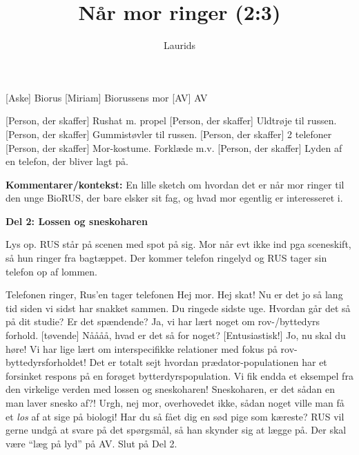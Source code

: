 \documentclass[a4paper,11pt]{article}
\title{Når mor ringer (2:3)}
\author{Laurids}
\begin{document}
\maketitle

\begin{roles}
    [Aske] Biorus
    [Miriam] Biorussens mor
    [AV] AV
\end{roles}

\begin{props}
    [Person, der skaffer] Rushat m. propel
    [Person, der skaffer] Uldtrøje til russen.
    [Person, der skaffer] Gummistøvler til russen.
    [Person, der skaffer] 2 telefoner
    [Person, der skaffer] Mor-kostume. Forklæde m.v.
    [Person, der skaffer] Lyden af en telefon, der bliver lagt på.
\end{props}

\begin{sketch}

\textbf{Kommentarer/kontekst:}
En lille sketch om hvordan det er når mor ringer til den unge BioRUS, der bare elsker sit fag, og hvad mor egentlig er interesseret i.


\begin{center}
\textbf{Del 2: Lossen og sneskoharen}
\end{center}

Lys op.
\scene RUS står på scenen med spot på sig. Mor når evt ikke ind pga sceneskift, så hun ringer fra bagtæppet. Der kommer telefon ringelyd og RUS tager sin telefon op af lommen.

\scene Telefonen ringer, Rus'en tager telefonen
 Hej mor.
 Hej skat! Nu er det jo så lang tid siden vi sidst har snakket sammen.
 Du ringede sidste uge.
 Hvordan går det så på dit studie? Er det spændende?
 Ja, vi har lært noget om rov-/byttedyrs forhold.
[tøvende] Nåååå, hvad er det så for noget?
[Entusiastisk!] Jo, nu skal du høre! Vi har lige lært om interspecifikke relationer med fokus på rov-byttedyrsforholdet! Det er totalt sejt hvordan prædator-populationen har et forsinket respons på en forøget bytterdyrspopulation. Vi fik endda et eksempel fra den virkelige verden med lossen og sneskoharen!
 Sneskoharen, er det sådan en man laver snesko af?!
 Urgh, nej mor, overhovedet ikke, sådan noget ville man få et \emph{los} af at sige på biologi!
 Har du så fået dig en sød pige som kæreste?
\scene RUS vil gerne undgå at svare på det spørgsmål, så han skynder sig at lægge på. Der skal være ``læg på lyd'' på AV.
\scene Slut på Del 2.

\end{sketch}
\end{document}
